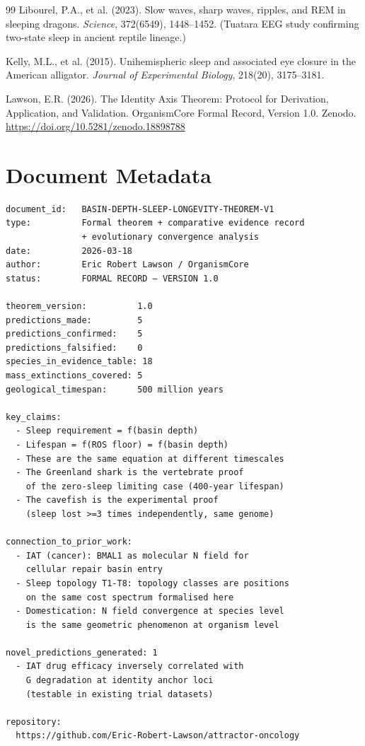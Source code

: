 \documentclass[12pt, a4paper]{article}
\begin{document}
\begin{thebibliography}{99}
Libourel, P.A., et al. (2023).
Slow waves, sharp waves, ripples, and REM in sleeping
dragons.
\textit{Science}, 372(6549), 1448--1452.
(Tuatara EEG study confirming two-state sleep in ancient
reptile lineage.)

Kelly, M.L., et al. (2015).
Unihemispheric sleep and associated eye closure in the
American alligator.
\textit{Journal of Experimental Biology}, 218(20), 3175--3181.

Lawson, E.R. (2026).
The Identity Axis Theorem: Protocol for Derivation,
Application, and Validation.
OrganismCore Formal Record, Version 1.0.
Zenodo. \url{https://doi.org/10.5281/zenodo.18898788}

\end{thebibliography}

\section*{Document Metadata}

\begin{verbatim}
document_id:   BASIN-DEPTH-SLEEP-LONGEVITY-THEOREM-V1
type:          Formal theorem + comparative evidence record
               + evolutionary convergence analysis
date:          2026-03-18
author:        Eric Robert Lawson / OrganismCore
status:        FORMAL RECORD — VERSION 1.0

theorem_version:          1.0
predictions_made:         5
predictions_confirmed:    5
predictions_falsified:    0
species_in_evidence_table: 18
mass_extinctions_covered: 5
geological_timespan:      500 million years

key_claims:
  - Sleep requirement = f(basin depth)
  - Lifespan = f(ROS floor) = f(basin depth)
  - These are the same equation at different timescales
  - The Greenland shark is the vertebrate proof
    of the zero-sleep limiting case (400-year lifespan)
  - The cavefish is the experimental proof
    (sleep lost >=3 times independently, same genome)

connection_to_prior_work:
  - IAT (cancer): BMAL1 as molecular N field for
    cellular repair basin entry
  - Sleep topology T1-T8: topology classes are positions
    on the same cost spectrum formalised here
  - Domestication: N field convergence at species level
    is the same geometric phenomenon at organism level

novel_predictions_generated: 1
  - IAT drug efficacy inversely correlated with
    G degradation at identity anchor loci
    (testable in existing trial datasets)

repository:
  https://github.com/Eric-Robert-Lawson/attractor-oncology
\end{verbatim}
\end{document}
